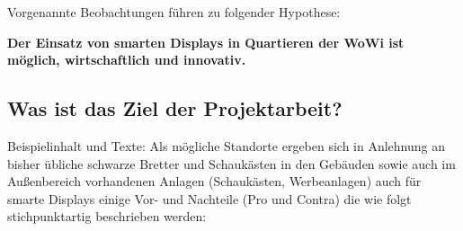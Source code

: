 \documentclass[12pt,oneside,titlepage]{scrartcl}
\begin{document}
Vorgenannte Beobachtungen führen zu folgender Hypothese:

 \Rightarrow \textbf{Der Einsatz von smarten Displays in Quartieren der \ac{WoWi} ist möglich, wirtschaftlich und innovativ.}



\subsection{Was ist das Ziel der Projektarbeit?}
Beispielinhalt und Texte:
Als mögliche Standorte ergeben sich in Anlehnung an bisher übliche \glqq{}schwarze Bretter\grqq{} und \glqq{}Schaukästen\grqq{} in den Gebäuden sowie auch im Außenbereich vorhandenen Anlagen (Schaukästen, Werbeanlagen) auch für smarte Displays einige Vor- und Nachteile (Pro und Contra) die wie folgt stichpunktartig beschrieben werden: 
\end{document}
